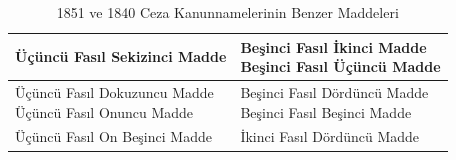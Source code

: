 \begin{table}[htbp]
\begin{tabular}{ |l|l| }
\hline
Üçüncü Fasıl Sekizinci Madde & \makecell[l]{Beşinci Fasıl İkinci Madde\\Beşinci Fasıl Üçüncü Madde} \\
\hline
\makecell[l]{Üçüncü Fasıl Dokuzuncu Madde\\Üçüncü Fasıl Onuncu Madde} & \makecell[l]{Beşinci Fasıl Dördüncü Madde\\Beşinci Fasıl Beşinci Madde} \\
\hline
Üçüncü Fasıl On Beşinci Madde & İkinci Fasıl Dördüncü Madde \\
\hline
\end{tabular}
\caption{1851 ve 1840 Ceza Kanunnamelerinin Benzer Maddeleri}
\label{tab:1851-1840}
\end{table}
